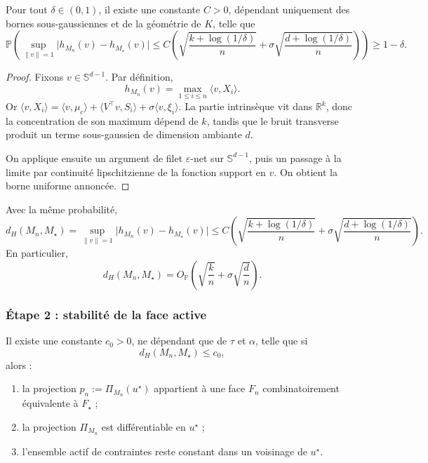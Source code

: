 \begin{lemma}
Pour tout \(\delta\in(0,1)\), il existe une constante \(C>0\), dépendant uniquement des bornes sous-gaussiennes et de la géométrie de \(K\), telle que
\[
\mathbb P\!\left(
\sup_{\|v\|=1}\bigl|h_{M_n}(v)-h_{M_\star}(v)\bigr|
\le
C\left(
\sqrt{\frac{k+\log(1/\delta)}{n}}
+
\sigma\sqrt{\frac{d+\log(1/\delta)}{n}}
\right)
\right)\ge 1-\delta.
\]
\end{lemma}

\begin{proof}
Fixons \(v\in\mathbb S^{d-1}\). Par définition,
\[
h_{M_n}(v)=\max_{1\le i\le n}\langle v,X_i\rangle.
\]
Or \(\langle v,X_i\rangle=\langle v,\mu_c\rangle+\langle V^\top v,S_i\rangle+\sigma\langle v,\xi_i\rangle\).
La partie intrinsèque vit dans \(\mathbb R^k\), donc la concentration de son maximum dépend de \(k\), tandis que le bruit transverse produit un terme sous-gaussien de dimension ambiante \(d\).

On applique ensuite un argument de filet \(\varepsilon\)-net sur \(\mathbb S^{d-1}\), puis un passage à la limite par continuité lipschitzienne de la fonction support en \(v\). On obtient la borne uniforme annoncée.
\end{proof}

\begin{corollary}[Hausdorff]
Avec la même probabilité,
\[
d_H(M_n,M_\star)
=
\sup_{\|v\|=1}\bigl|h_{M_n}(v)-h_{M_\star}(v)\bigr|
\le
C\left(
\sqrt{\frac{k+\log(1/\delta)}{n}}
+
\sigma\sqrt{\frac{d+\log(1/\delta)}{n}}
\right).
\]
En particulier,
\[
d_H(M_n,M_\star)=O_{\mathbb P}\!\left(\sqrt{\frac{k}{n}}+\sigma\sqrt{\frac{d}{n}}\right).
\]
\end{corollary}

\subsubsection{Étape 2 : stabilité de la face active}

\begin{lemma}
Il existe une constante \(c_0>0\), ne dépendant que de \(\tau\) et \(\alpha\), telle que si
\[
d_H(M_n,M_\star)\le c_0,
\]
alors :
\begin{enumerate}
    \item la projection \(p_n:=\Pi_{M_n}(u^\star)\) appartient à une face \(F_n\) combinatoirement équivalente à \(F_\star\) ;
    \item la projection \(\Pi_{M_n}\) est différentiable en \(u^\star\) ;
    \item l'ensemble actif de contraintes reste constant dans un voisinage de \(u^\star\).
\end{enumerate}
\end{lemma}

